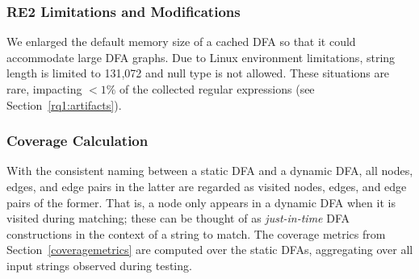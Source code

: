 \subsubsection{RE2 Limitations and Modifications}
\label{dfageneration}
We enlarged the default memory size of a cached DFA so that it could accommodate large DFA graphs. Due to Linux environment limitations, string length is limited to 131,072 and null type is not allowed.
 These situations are rare, impacting  $<1$\% of the collected regular expressions (see Section~\ref{rq1:artifacts}). 



\subsubsection{Coverage Calculation} 
With the consistent naming between a static DFA and a dynamic DFA, all nodes, edges, and edge pairs in the latter are regarded as visited nodes, edges, and edge pairs of the former. 
That is, a node only appears in a dynamic DFA when it is visited during matching; these can be thought of as \emph{just-in-time} DFA constructions in the context of a string to match. 
The coverage metrics from Section~\ref{coveragemetrics} are computed over the static DFAs, aggregating over all input strings observed during testing. 




